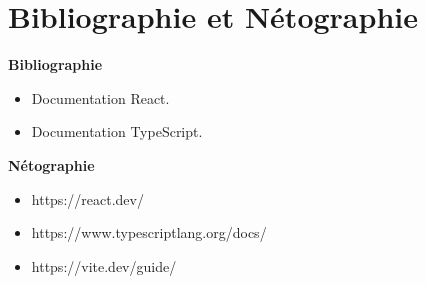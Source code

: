\chapter*{Bibliographie et Nétographie}

\textbf{Bibliographie}
\begin{itemize}
  \item [1] Documentation React.
  \item [2] Documentation TypeScript.
\end{itemize}

\textbf{Nétographie}
\begin{itemize}
  \item https://react.dev/
  \item https://www.typescriptlang.org/docs/
  \item https://vite.dev/guide/
\end{itemize}
